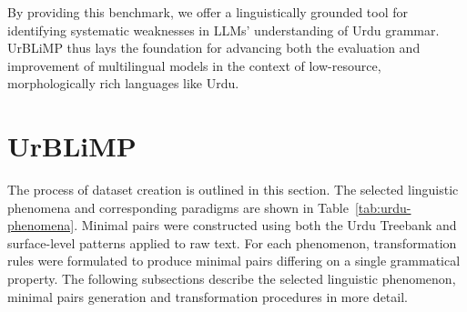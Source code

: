 \documentclass[11pt]{article}
\begin{document}
By providing this benchmark, we offer a linguistically grounded tool for identifying systematic weaknesses in LLMs’ understanding of Urdu grammar. UrBLiMP thus lays the foundation for advancing both the evaluation and improvement of multilingual models in the context of low-resource, morphologically rich languages like Urdu.

\section{UrBLiMP}
The process of dataset creation is outlined in this section. The selected linguistic phenomena and corresponding paradigms are shown in Table~\ref{tab:urdu-phenomena}. Minimal pairs were constructed using both the Urdu Treebank and surface-level patterns applied to raw text. For each phenomenon, transformation rules were formulated to produce minimal pairs differing on a single grammatical property. The following subsections describe the selected linguistic phenomenon, minimal pairs generation and transformation procedures in more detail.
\FloatBarrier  %
\end{document}
